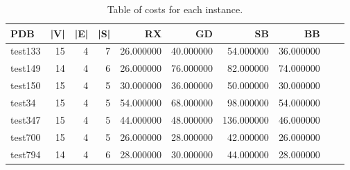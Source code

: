 \begin{table}
\caption{Table of costs for each instance.}
\label{tab:costs}
\begin{tabular}{lrrrrrrrrr}
\toprule
PDB & |V| & |E| & |S| & RX & GD & SB & BB \\
\midrule
test133 & 15 & 4 & 7 & 26.000000 & 40.000000 & 54.000000 & 36.000000 \\
test149 & 14 & 4 & 6 & 26.000000 & 76.000000 & 82.000000 & 74.000000 \\
test150 & 15 & 4 & 5 & 30.000000 & 36.000000 & 50.000000 & 30.000000 \\
test34 & 15 & 4 & 5 & 54.000000 & 68.000000 & 98.000000 & 54.000000 \\
test347 & 15 & 4 & 5 & 44.000000 & 48.000000 & 136.000000 & 46.000000 \\
test700 & 15 & 4 & 5 & 26.000000 & 28.000000 & 42.000000 & 26.000000 \\
test794 & 14 & 4 & 6 & 28.000000 & 30.000000 & 44.000000 & 28.000000 \\
\bottomrule
\end{tabular}
\end{table}
